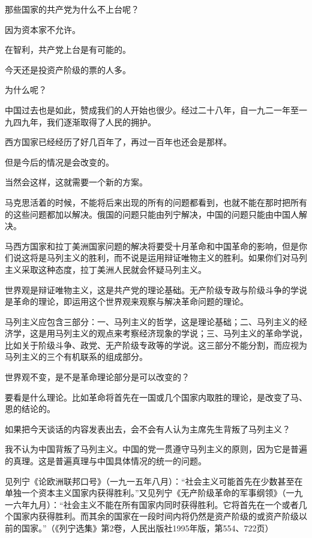 那些国家的共产党为什么不上台呢？

因为资本家不允许。

在智利，共产党上台是有可能的。

今天还是投资产阶级的票的人多。

为什么呢？

中国过去也是如此，赞成我们的人开始也很少。经过二十八年，自一九二一年至一九四九年，我们逐渐取得了人民的拥护。

西方国家已经经历了好几百年了，再过一百年也还会是那样。

但是今后的情况是会改变的。

当然会这样，这就需要一个新的方案。

马克思活着的时候，不能将后来出现的所有的问题都看到，也就不能在那时把所有的这些问题都加以解决。俄国的问题只能由列宁解决，中国的问题只能由中国人解决。

马西方国家和拉丁美洲国家问题的解决将要受十月革命和中国革命的影响，但是你们说这将是马列主义的胜利，而不说是运用辩证唯物主义的胜利。如果你们对马列主义采取这种态度，拉丁美洲人民就会怀疑马列主义。

世界观是辩证唯物主义，这是共产党的理论基础。无产阶级专政与阶级斗争的学说是革命的理论，即运用这个世界观来观察与解决革命问题的理论。

马列主义应包含三部分：一、马列主义的哲学，这是理论基础；二、马列主义的经济学，这是用马列主义的观点来考察经济现象的学说；三、马列主义的革命学说，比如关于阶级斗争、政党、无产阶级专政等的学说。这三部分不能分割，而应视为马列主义的三个有机联系的组成部分。

世界观不变，是不是革命理论部分是可以改变的？

要看是什么理论。比如革命将首先在一国或几个国家内取胜的理论，是改变了马、恩的结论的。

如果把今天谈话的内容发表出去，会不会有人认为主席先生背叛了马列主义？

我不认为中国背叛了马列主义。中国的党一贯遵守马列主义的原则，因为它是普遍的真理。这是普遍真理与中国具体情况的统一的问题。

\begin{maonote}
见列宁《论欧洲联邦口号》（一九一五年八月）：“社会主义可能首先在少数甚至在单独一个资本主义国家内获得胜利。”又见列宁《无产阶级革命的军事纲领》（一九一六年九月）：“社会主义不能在所有国家内同时获得胜利。它将首先在一个或者几个国家内获得胜利。而其余的国家在一段时间内将仍然是资产阶级的或资产阶级以前的国家。”（《列宁选集》第2卷，人民出版社1995年版，第554、722页）
\end{maonote}
